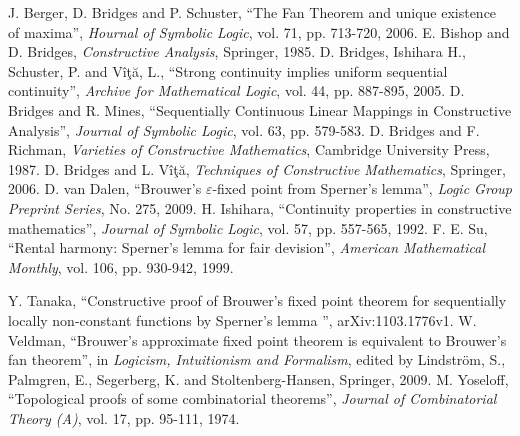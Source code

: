 \documentclass[reqno]{amsart}
\begin{document}
\begin{thebibliography}{9999}

 J. Berger, D. Bridges and P. Schuster, ``The Fan Theorem and unique existence of maxima'', \textit{Hournal of Symbolic Logic}, vol. 71, pp. 713-720, 2006.
 E. Bishop and D. Bridges, \textit{Constructive Analysis}, Springer, 1985.
 D. Bridges, Ishihara H., Schuster, P. and V\^{i}\c{t}\u{a}, L., ``Strong continuity implies uniform sequential continuity'', \textit{Archive for Mathematical Logic}, vol. 44, pp. 887-895, 2005.
 D. Bridges and R. Mines, ``Sequentially Continuous Linear Mappings in Constructive Analysis'', \textit{Journal of Symbolic Logic}, vol. 63, pp. 579-583.
 D. Bridges and F. Richman, \textit{Varieties of Constructive Mathematics}, Cambridge University Press, 1987.
 D. Bridges and L. V\^{i}\c{t}\u{a}, \textit{Techniques of Constructive Mathematics}, Springer, 2006.
 D. van Dalen, ``Brouwer's $\varepsilon$-fixed point from Sperner's lemma'', \textit{Logic Group Preprint Series}, No. 275, 2009.
 H. Ishihara, ``Continuity properties in constructive mathematics'', \textit{Journal of Symbolic Logic}, vol. 57, pp. 557-565, 1992.
 F. E. Su, ``Rental harmony: Sperner's lemma for fair devision'', \textit{American Mathematical Monthly}, vol. 106, pp. 930-942, 1999.

 Y. Tanaka, ``Constructive proof of Brouwer's fixed point theorem for sequentially locally non-constant functions by Sperner's lemma
'',  arXiv:1103.1776v1.
 W. Veldman, ``Brouwer's approximate fixed point theorem is equivalent to Brouwer's fan theorem'', in \textit{Logicism, Intuitionism and Formalism}, edited by Lindstr\"{o}m, S., Palmgren, E., Segerberg, K. and Stoltenberg-Hansen, Springer, 2009.
 M. Yoseloff, ``Topological proofs of some combinatorial theorems'', \textit{Journal of Combinatorial Theory (A)}, vol. 17, pp. 95-111, 1974.

\end{thebibliography}
\end{document}
